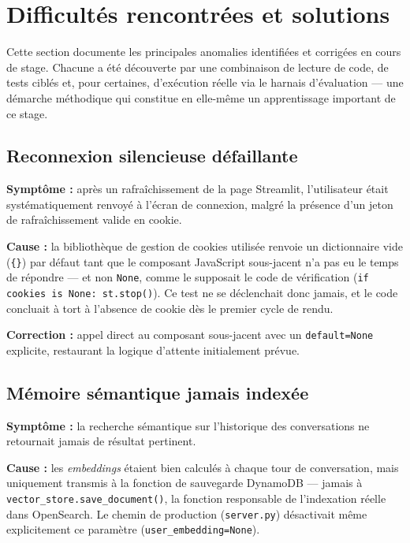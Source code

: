 \documentclass[11pt,a4paper]{report}
\begin{document}
\chapter{Difficultés rencontrées et solutions}
\label{chap:difficultes}

Cette section documente les principales anomalies identifiées et
corrigées en cours de stage. Chacune a été découverte par une
combinaison de lecture de code, de tests ciblés et, pour certaines,
d'exécution réelle via le harnais d'évaluation — une démarche
méthodique qui constitue en elle-même un apprentissage important de ce
stage.

\section{Reconnexion silencieuse défaillante}

\textbf{Symptôme :} après un rafraîchissement de la page Streamlit,
l'utilisateur était systématiquement renvoyé à l'écran de connexion,
malgré la présence d'un jeton de rafraîchissement valide en cookie.

\textbf{Cause :} la bibliothèque de gestion de cookies utilisée
renvoie un dictionnaire vide (\texttt{\{\}}) par défaut tant que le
composant JavaScript sous-jacent n'a pas eu le temps de répondre — et
non \texttt{None}, comme le supposait le code de vérification
(\texttt{if cookies is None: st.stop()}). Ce test ne se déclenchait
donc jamais, et le code concluait à tort à l'absence de cookie dès le
premier cycle de rendu.

\textbf{Correction :} appel direct au composant sous-jacent avec un
\texttt{default=None} explicite, restaurant la logique d'attente
initialement prévue.

\section{Mémoire sémantique jamais indexée}
\label{sec:bug-embeddings}

\textbf{Symptôme :} la recherche sémantique sur l'historique des
conversations ne retournait jamais de résultat pertinent.

\textbf{Cause :} les \textit{embeddings} étaient bien calculés à
chaque tour de conversation, mais uniquement transmis à la fonction de
sauvegarde DynamoDB — jamais à \texttt{vector\_store.save\_document()},
la fonction responsable de l'indexation réelle dans OpenSearch. Le
chemin de production (\texttt{server.py}) désactivait même
explicitement ce paramètre (\texttt{user\_embedding=None}).
\end{document}
